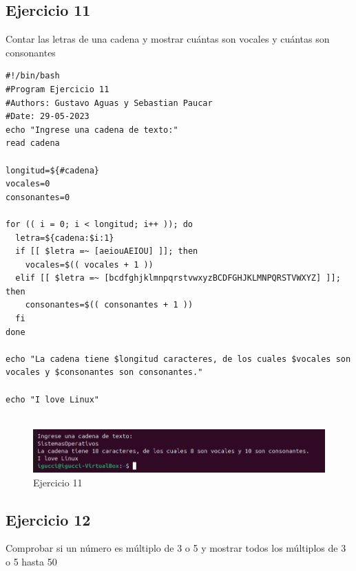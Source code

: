 \documentclass[11pt,twoside]{book}
\begin{document}
\subsection{Ejercicio 11}
Contar las letras de una cadena y mostrar cuántas son vocales y cuántas son consonantes

\begin{lstlisting}
#!/bin/bash
#Program Ejercicio 11
#Authors: Gustavo Aguas y Sebastian Paucar
#Date: 29-05-2023
echo "Ingrese una cadena de texto:"
read cadena

longitud=${#cadena}
vocales=0
consonantes=0

for (( i = 0; i < longitud; i++ )); do
  letra=${cadena:$i:1}
  if [[ $letra =~ [aeiouAEIOU] ]]; then
    vocales=$(( vocales + 1 ))
  elif [[ $letra =~ [bcdfghjklmnpqrstvwxyzBCDFGHJKLMNPQRSTVWXYZ] ]]; then
    consonantes=$(( consonantes + 1 ))
  fi
done

echo "La cadena tiene $longitud caracteres, de los cuales $vocales son vocales y $consonantes son consonantes."

echo "I love Linux"


\end{lstlisting}
\begin{figure}[h]
    \centering
    \includegraphics[width=1\linewidth]{Ej11.png}
    \caption{Ejercicio 11}
\end{figure}
\newpage
\subsection{Ejercicio 12}

Comprobar si un número es múltiplo de 3 o 5 y mostrar todos los múltiplos de 3 o 5 hasta 50
\end{document}
